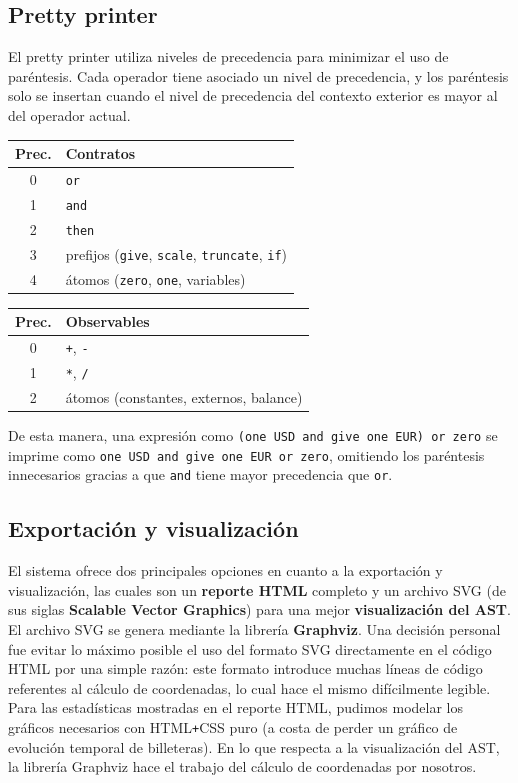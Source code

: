 \documentclass[a4paper, 12pt]{article}
\begin{document}
\subsection{Pretty printer}

El pretty printer utiliza niveles de precedencia para minimizar el uso de paréntesis. Cada operador tiene asociado un nivel de precedencia, y los paréntesis solo se insertan cuando el nivel de precedencia del contexto exterior es mayor al del operador actual.

\begin{center}
\begin{tabular}{c l}
\toprule
\textbf{Prec.} & \textbf{Contratos} \\
\midrule
0 & \texttt{or} \\
1 & \texttt{and} \\
2 & \texttt{then} \\
3 & prefijos (\texttt{give}, \texttt{scale}, \texttt{truncate}, \texttt{if}) \\
4 & átomos (\texttt{zero}, \texttt{one}, variables) \\
\bottomrule
\end{tabular}
\hspace{1cm}
\begin{tabular}{c l}
\toprule
\textbf{Prec.} & \textbf{Observables} \\
\midrule
0 & \texttt{+}, \texttt{-} \\
1 & \texttt{*}, \texttt{/} \\
2 & átomos (constantes, externos, balance) \\
\bottomrule
\end{tabular}
\end{center}

De esta manera, una expresión como \texttt{(one USD and give one EUR) or zero} se imprime como \texttt{one USD and give one EUR or zero}, omitiendo los paréntesis innecesarios gracias a que \texttt{and} tiene mayor precedencia que \texttt{or}.

\subsection{Exportación y visualización}

El sistema ofrece dos principales opciones en cuanto a la exportación y visualización, las cuales son un \textbf{reporte HTML} completo y un archivo SVG (de sus siglas \textbf{Scalable Vector Graphics}) para una mejor \textbf{visualización del AST}. El archivo SVG se genera mediante la librería \textbf{Graphviz}. Una decisión personal fue evitar lo máximo posible el uso del formato SVG directamente en el código HTML por una simple razón: este formato introduce muchas líneas de código referentes al cálculo de coordenadas, lo cual hace el mismo difícilmente legible. Para las estadísticas mostradas en el reporte HTML, pudimos modelar los gráficos necesarios con HTML\texttt{+}CSS puro (a costa de perder un gráfico de evolución temporal de billeteras). En lo que respecta a la visualización del AST, la librería Graphviz hace el trabajo del cálculo de coordenadas por nosotros.
\end{document}
